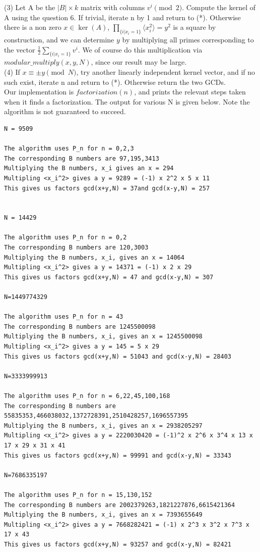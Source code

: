 \documentclass[10pt,a4paper]{report}
\begin{document}
(3) Let A be the $|B|\times k$ matrix with columns $v^{i} \pmod 2$. Compute the kernel of A using the question 6. If trivial, iterate n by 1 and return to (*). Otherwise there is a non zero $x \in \ker{(A)}$, $\prod_{\{i | x_i = 1\}} \langle x_i^2 \rangle = y^2$ is a square by construction, and we can determine $y$ by multiplying all primes corresponding to the vector $\frac{1}{2}\sum_{\{i | x_i = 1\}}v^i$. We of course do this multiplication via $modular\_multiply(x,y,N)$, since our result may be large. \\

(4) If $x \equiv \pm y \pmod N$, try another linearly independent kernel vector, and if no such exist, iterate n and return to (*). Otherwise return the two GCDs.\\
 
Our implementation is $factorization(n)$, and prints the relevant steps taken when it finds a factorization. The output for various N is given below. Note the algorithm is not guaranteed to succeed.

\begin{lstlisting}[breaklines]	
N = 9509

The algorithm uses P_n for n = 0,2,3
The corresponding B numbers are 97,195,3413
Multiplying the B numbers, x_i gives an x = 294
Multipling <x_i^2> gives a y = 9289 = (-1) x 2^2 x 5 x 11
This gives us factors gcd(x+y,N) = 37and gcd(x-y,N) = 257


N = 14429

The algorithm uses P_n for n = 0,2
The corresponding B numbers are 120,3003
Multiplying the B numbers, x_i, gives an x = 14064
Multipling <x_i^2> gives a y = 14371 = (-1) x 2 x 29
This gives us factors gcd(x+y,N) = 47 and gcd(x-y,N) = 307

N=1449774329

The algorithm uses P_n for n = 43
The corresponding B numbers are 1245500098
Multiplying the B numbers, x_i, gives an x = 1245500098
Multipling <x_i^2> gives a y = 145 = 5 x 29
This gives us factors gcd(x+y,N) = 51043 and gcd(x-y,N) = 28403

N=3333999913

The algorithm uses P_n for n = 6,22,45,100,168
The corresponding B numbers are 55835353,466038032,1372728391,2510428257,1696557395
Multiplying the B numbers, x_i, gives an x = 2938205297
Multipling <x_i^2> gives a y = 2220030420 = (-1)^2 x 2^6 x 3^4 x 13 x 17 x 29 x 31 x 41
This gives us factors gcd(x+y,N) = 99991 and gcd(x-y,N) = 33343

N=7686335197

The algorithm uses P_n for n = 15,130,152
The corresponding B numbers are 2002379263,1821227876,6615421364
Multiplying the B numbers, x_i, gives an x = 7393655649
Multipling <x_i^2> gives a y = 7668282421 = (-1) x 2^3 x 3^2 x 7^3 x 17 x 43
This gives us factors gcd(x+y,N) = 93257 and gcd(x-y,N) = 82421

\end{lstlisting}
\end{document}
